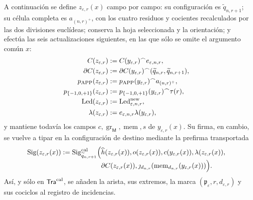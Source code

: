 A continuación se define \(z_{\varepsilon,r}(x)\) campo por campo: su
configuración es \(\widetilde q_{n,r+1}\); su célula completa es
\(a_{(n,r)^+}\), con los
cuatro residuos y cocientes recalculados por las dos divisiones euclídeas;
conserva la hoja seleccionada y la orientación; y efectúa las seis
actualizaciones siguientes, en las que sólo se omite el argumento común \(x\):
\begin{equation}
\begin{aligned}
 C(z_{\varepsilon,r})&:=C(y_{\varepsilon,r})^\frown
       e_{\varepsilon,n,r},\\
 \partial C(z_{\varepsilon,r})&:=\partial C(y_{\varepsilon,r})^\frown
       (\widetilde q_{n,r},\widetilde q_{n,r+1}),\\
 p_{\mathrm{APP}}(z_{\varepsilon,r})&:=p_{\mathrm{APP}}(y_{\varepsilon,r})^\frown
       a_{(n,r)^+},\\
 p_{\{-1,0,+1\}}(z_{\varepsilon,r})&:=p_{\{-1,0,+1\}}(y_{\varepsilon,r})^\frown
       \tau(r),\\
 \operatorname{Led}(z_{\varepsilon,r})&:=
       \operatorname{Led}^{\rm new}_{\varepsilon,n,r},\\
 \lambda(z_{\varepsilon,r})&:=e_{\varepsilon,n,r}
       \lambda(y_{\varepsilon,r}),
\end{aligned}
 \label{hmtfg:eq:tupla-tra-cal-ch}
\end{equation}
y mantiene todavía los campos
\(c,\operatorname{gr}_{\mathsf M},\operatorname{mem},s\) de
\(y_{\varepsilon,r}(x)\). Su firma, en cambio, se vuelve a tipar en la
configuración de destino mediante la prefirma transportada
\begin{equation}
\begin{aligned}
 \operatorname{Sig}(z_{\varepsilon,r}(x))
  :=\operatorname{Sig}^{\rm cal}_{\widetilde q_{n,r+1}}
       \Bigl(&\widehat h(z_{\varepsilon,r}(x)),
             o(z_{\varepsilon,r}(x)),c(y_{\varepsilon,r}(x)),
             \lambda(z_{\varepsilon,r}(x)),\\[-2pt]
             &\partial C(z_{\varepsilon,r}(x)),
             \jmath_{d_{n,r}}
                (\operatorname{mem}_{d_{n,r}}
                   (y_{\varepsilon,r}(x)))\Bigr).
\end{aligned}
\label{hmtfg:eq:prefirma-transporte-cal-ch}
\end{equation}
Así, y sólo en
\(\mathsf{Tra}^{\rm cal}\), se añaden la arista, sus extremos, la marca
\((\mathfrak p_\varepsilon,r,d_{\varepsilon,r})\) y sus cociclos al registro de
incidencias.


